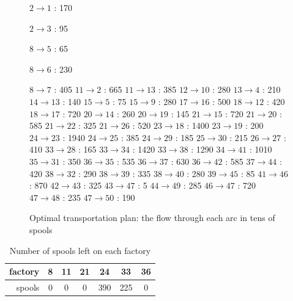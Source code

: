 \begin{figure}[H]
\centering
\begin{multicols}{5}
$ 2 \rightarrow 1 $ : 170

$ 2 \rightarrow 3 $ : 95

$ 8 \rightarrow 5 $ : 65

$ 8 \rightarrow 6 $ : 230

$ 8 \rightarrow 7 $ : 405
$ 11 \rightarrow 2 $ : 665
$ 11 \rightarrow 13 $ : 385
$ 12 \rightarrow 10 $ : 280
$ 13 \rightarrow 4 $ : 210
$ 14 \rightarrow 13 $ : 140
$ 15 \rightarrow 5 $ : 75
$ 15 \rightarrow 9 $ : 280
$ 17 \rightarrow 16 $ : 500
$ 18 \rightarrow 12 $ : 420
$ 18 \rightarrow 17 $ : 720
$ 20 \rightarrow 14 $ : 260
$ 20 \rightarrow 19 $ : 145
$ 21 \rightarrow 15 $ : 720
$ 21 \rightarrow 20 $ : 585
$ 21 \rightarrow 22 $ : 325
$ 21 \rightarrow 26 $ : 520
$ 23 \rightarrow 18 $ : 1400
$ 23 \rightarrow 19 $ : 200
$ 24 \rightarrow 23 $ : 1940
$ 24 \rightarrow 25 $ : 385
$ 24 \rightarrow 29 $ : 185
$ 25 \rightarrow 30 $ : 215
$ 26 \rightarrow 27 $ : 410
$ 33 \rightarrow 28 $ : 165
$ 33 \rightarrow 34 $ : 1420
$ 33 \rightarrow 38 $ : 1290
$ 34 \rightarrow 41 $ : 1010
$ 35 \rightarrow 31 $ : 350
$ 36 \rightarrow 35 $ : 535
$ 36 \rightarrow 37 $ : 630
$ 36 \rightarrow 42 $ : 585
$ 37 \rightarrow 44 $ : 420
$ 38 \rightarrow 32 $ : 290
$ 38 \rightarrow 39 $ : 335
$ 38 \rightarrow 40 $ : 280
$ 39 \rightarrow 45 $ : 85
$ 41 \rightarrow 46 $ : 870
$ 42 \rightarrow 43 $ : 325
$ 43 \rightarrow 47 $ : 5
$ 44 \rightarrow 49 $ : 285
$ 46 \rightarrow 47 $ : 720
$ 47 \rightarrow 48 $ : 235
$ 47 \rightarrow 50 $ : 190
\end{multicols}
\caption{Optimal transportation plan: the flow through each arc in tens of spools}
\label{flow3-1a}
\end{figure}

\begin{table}[H]
\centering
\begin{tabular}{|r|c|c|c|c|c|c|}
\hline
factory & 8 & 11 & 21 & 24 & 33 & 36 \\ \hline
spools & 0 & 0 & 0 & 390 & 225 & 0   \\ \hline
\end{tabular}
\caption{Number of spools left on each factory}
\label{spools-left}
\end{table}

